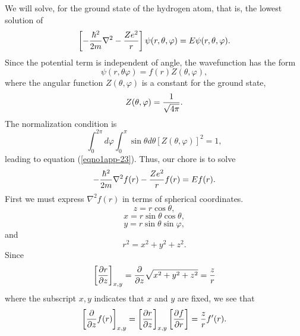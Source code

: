 We will solve, for the ground state of the hydrogen atom, that is, the 
lowest solution of
\begin{equation}
\left[ - {\hbar^2 \over 2m} \nabla^2 - {Ze^2 \over r} \right] \psi ( 
r , \theta , \varphi ) = E \psi ( r , \theta , \varphi ).
\label{eqno1app-22}
\end{equation}
Since the potential term is independent of angle, the wavefunction has
the form
\begin{equation}
\psi ( r , \theta \varphi ) = f ( r ) Z ( \theta , \varphi ) ,
\end{equation}
where the angular function $Z( \theta, \varphi)$ is a constant for the
ground state,
\begin{equation}
Z ( \theta , \varphi ) = {1 \over \sqrt{4 \pi}}.
\label{eqno1app-23}
\end{equation}
The normalization condition is
\begin{equation}
\int^{2 \pi}_{0} d \varphi \int^{\pi}_{0} \sin \theta d 
\theta \left[ Z \left( \theta , \varphi \right) \right]^2 = 1,
\end{equation}
leading to equation (\ref{eqno1app-23}). Thus, our chore is to solve
\begin{equation}
- {\hbar^2 \over 2m} \nabla^2 f ( r ) - {Ze^2 \over r} f ( r ) 
= E f ( r ).
\label{eqno1app-24}
\end{equation}
First we must express $\nabla^2 f ( r )$ in terms of spherical 
coordinates.
\begin{equation}
z = r \cos \theta,
\end{equation}
\begin{equation}
x = r \sin \theta \cos \theta,
\end{equation}
\begin{equation}
y = r \sin \theta \sin \varphi,
\end{equation} 
and 
\begin{equation}
r^2 = x^2 + y^2 + z^2.
\end{equation}
Since
\begin{equation}
\left[ {\partial r \over \partial z} \right]_{x,y} = {\partial \over 
\partial z} \sqrt{x^2 + y^2 + z^2} = {z \over r}
\end{equation}
where the subscript $x,y$ indicates that $x$ and $y$ are fixed, we 
see that
\begin{equation}
\left[ {\partial \over \partial z} f ( r ) \right]_{x,y} = \left[ 
{\partial r \over \partial z} \right]_{x,y} \left[ {\partial f \over 
\partial r} \right] = {z \over r} f^\prime( r ) .
\end{equation}
